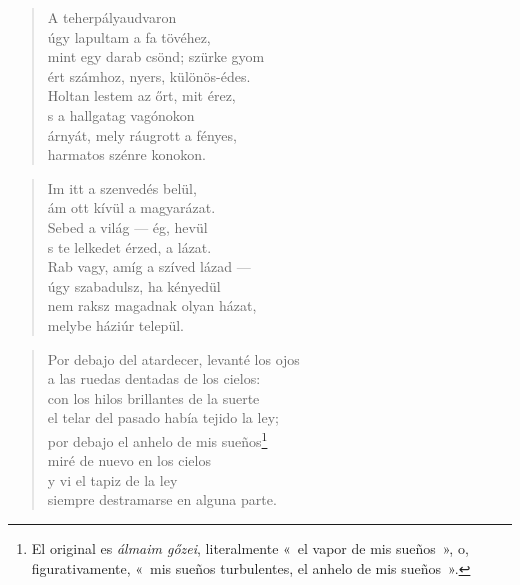 \newpage

\vspace*{-15mm}
\centeredornament



\begin{verse}
  A teherpályaudvaron \\
  úgy lapultam a fa tövéhez, \\
  mint egy darab csönd; szürke gyom \\
  ért számhoz, nyers, különös-édes. \\
  Holtan lestem az őrt, mit érez, \\
  s a hallgatag vagónokon \\
  árnyát, mely ráugrott a fényes, \\
  harmatos szénre konokon.
\end{verse}

\bigskip


\begin{verse}
  Im itt a szenvedés belül, \\
  ám ott kívül a magyarázat. \\
  Sebed a világ --- ég, hevül \\
  s te lelkedet érzed, a lázat. \\
  Rab vagy, amíg a szíved lázad --- \\
  úgy szabadulsz, ha kényedül \\
  nem raksz magadnak olyan házat, \\
  melybe háziúr települ.
\end{verse}

\newpage

\vspace*{-15mm}
\centeredornament




\begin{verse}
  Por debajo del atardecer, levanté los ojos \\
  a las ruedas dentadas de los cielos: \\
  con los hilos brillantes de la suerte \\
  el telar del pasado había tejido la ley; \\
  por debajo el anhelo de mis sueños\footnote{El original
  es \emph{álmaim gőzei}, literalmente «~el vapor de mis sueños~», o,
  figurativamente, «~mis sueños turbulentes, el anhelo de mis
  sueños~».} \\
  miré de nuevo en los cielos \\
  y vi el tapiz de la ley \\
  siempre destramarse en alguna parte. \\
\end{verse}

